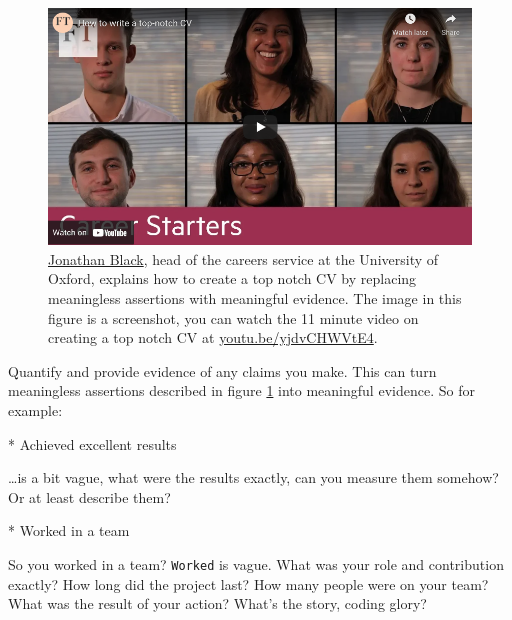 \documentclass[
]{book}
\newenvironment{Shaded}{\begin{snugshade}}{\end{snugshade}}
\newcommand{\NormalTok}[1]{#1}
\newcommand{\SpecialStringTok}[1]{\textcolor[rgb]{0.31,0.60,0.02}{#1}}
\begin{document}
\begin{figure}

{\centering \includegraphics[width=0.99\linewidth]{images/youtube-jonathan-black} 

}

\caption{\href{https://twitter.com/jonathanpblack}{Jonathan Black}, head of the careers service at the University of Oxford, explains how to create a top notch CV by replacing meaningless assertions with meaningful evidence. \citep{topnotchcv} The image in this figure is a screenshot, you can watch the 11 minute video on creating a top notch CV at \href{https://youtu.be/yjdvCHWVtE4}{youtu.be/yjdvCHWVtE4}.}\label{fig:black-fig}
\end{figure}



Quantify and provide evidence of any claims you make. This can turn meaningless assertions described in figure \ref{fig:black-fig} into meaningful evidence. So for example:

\begin{Shaded}
\begin{Highlighting}[]
\SpecialStringTok{* }\NormalTok{Achieved excellent results}
\end{Highlighting}
\end{Shaded}

\ldots is a bit vague, what were the results exactly, can you measure them somehow? Or at least describe them?

\begin{Shaded}
\begin{Highlighting}[]
\SpecialStringTok{* }\NormalTok{Worked in a team}
\end{Highlighting}
\end{Shaded}

So you worked in a team? \texttt{Worked} is vague. What was your role and contribution exactly? How long did the project last? How many people were on your team? What was the result of your action? What's the story, coding glory?
\end{document}
